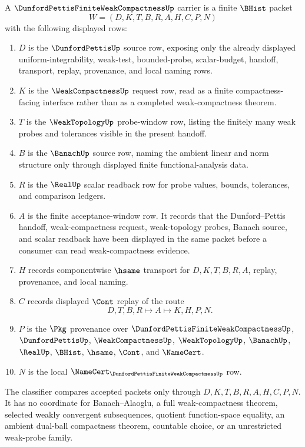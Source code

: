 \begin{definition}
\label{def:dunford-pettis-finite-weak-compactness-carrier}
A $\DunfordPettisFiniteWeakCompactnessUp$ carrier is a finite $\BHist$ packet
$$
W=(D,K,T,B,R,A,H,C,P,N)
$$
with the following displayed rows:
\begin{enumerate}
\item $D$ is the $\DunfordPettisUp$ source row, exposing only the already displayed uniform-integrability, weak-test, bounded-probe, scalar-budget, handoff, transport, replay, provenance, and local naming rows.
\item $K$ is the $\WeakCompactnessUp$ request row, read as a finite compactness-facing interface rather than as a completed weak-compactness theorem.
\item $T$ is the $\WeakTopologyUp$ probe-window row, listing the finitely many weak probes and tolerances visible in the present handoff.
\item $B$ is the $\BanachUp$ source row, naming the ambient linear and norm structure only through displayed finite functional-analysis data.
\item $R$ is the $\RealUp$ scalar readback row for probe values, bounds, tolerances, and comparison ledgers.
\item $A$ is the finite acceptance-window row. It records that the Dunford--Pettis handoff, weak-compactness request, weak-topology probes, Banach source, and scalar readback have been displayed in the same packet before a consumer can read weak-compactness evidence.
\item $H$ records componentwise $\hsame$ transport for $D,K,T,B,R,A$, replay, provenance, and local naming.
\item $C$ records displayed $\Cont$ replay of the route
$$
D,T,B,R \longmapsto A \longmapsto K,H,P,N .
$$
\item $P$ is the $\Pkg$ provenance over $\DunfordPettisFiniteWeakCompactnessUp$, $\DunfordPettisUp$, $\WeakCompactnessUp$, $\WeakTopologyUp$, $\BanachUp$, $\RealUp$, $\BHist$, $\hsame$, $\Cont$, and $\NameCert$.
\item $N$ is the local $\NameCert_{\DunfordPettisFiniteWeakCompactnessUp}$ row.
\end{enumerate}
The classifier compares accepted packets only through $D,K,T,B,R,A,H,C,P,N$. It has no coordinate for Banach--Alaoglu, a full weak-compactness theorem, selected weakly convergent subsequences, quotient function-space equality, an ambient dual-ball compactness theorem, countable choice, or an unrestricted weak-probe family.
\end{definition}

